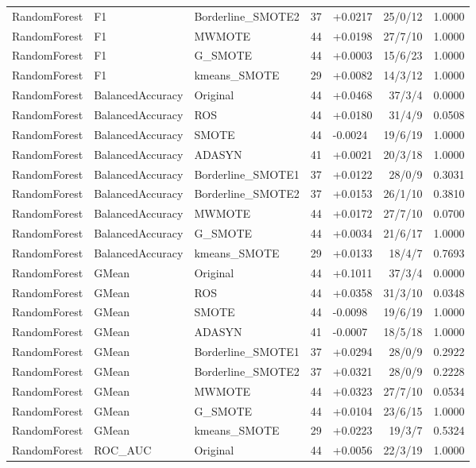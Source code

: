 \documentclass[10pt,a4paper]{article}
\begin{document}
\begin{longtable}{lllllrr}
RandomForest & F1 & Borderline\_SMOTE2 & 37 & +0.0217 & 25/0/12 & 1.0000 \\
RandomForest & F1 & MWMOTE & 44 & +0.0198 & 27/7/10 & 1.0000 \\
RandomForest & F1 & G\_SMOTE & 44 & +0.0003 & 15/6/23 & 1.0000 \\
RandomForest & F1 & kmeans\_SMOTE & 29 & +0.0082 & 14/3/12 & 1.0000 \\
RandomForest & BalancedAccuracy & Original & 44 & +0.0468 & 37/3/4 & 0.0000 \\
RandomForest & BalancedAccuracy & ROS & 44 & +0.0180 & 31/4/9 & 0.0508 \\
RandomForest & BalancedAccuracy & SMOTE & 44 & -0.0024 & 19/6/19 & 1.0000 \\
RandomForest & BalancedAccuracy & ADASYN & 41 & +0.0021 & 20/3/18 & 1.0000 \\
RandomForest & BalancedAccuracy & Borderline\_SMOTE1 & 37 & +0.0122 & 28/0/9 & 0.3031 \\
RandomForest & BalancedAccuracy & Borderline\_SMOTE2 & 37 & +0.0153 & 26/1/10 & 0.3810 \\
RandomForest & BalancedAccuracy & MWMOTE & 44 & +0.0172 & 27/7/10 & 0.0700 \\
RandomForest & BalancedAccuracy & G\_SMOTE & 44 & +0.0034 & 21/6/17 & 1.0000 \\
RandomForest & BalancedAccuracy & kmeans\_SMOTE & 29 & +0.0133 & 18/4/7 & 0.7693 \\
RandomForest & GMean & Original & 44 & +0.1011 & 37/3/4 & 0.0000 \\
RandomForest & GMean & ROS & 44 & +0.0358 & 31/3/10 & 0.0348 \\
RandomForest & GMean & SMOTE & 44 & -0.0098 & 19/6/19 & 1.0000 \\
RandomForest & GMean & ADASYN & 41 & -0.0007 & 18/5/18 & 1.0000 \\
RandomForest & GMean & Borderline\_SMOTE1 & 37 & +0.0294 & 28/0/9 & 0.2922 \\
RandomForest & GMean & Borderline\_SMOTE2 & 37 & +0.0321 & 28/0/9 & 0.2228 \\
RandomForest & GMean & MWMOTE & 44 & +0.0323 & 27/7/10 & 0.0534 \\
RandomForest & GMean & G\_SMOTE & 44 & +0.0104 & 23/6/15 & 1.0000 \\
RandomForest & GMean & kmeans\_SMOTE & 29 & +0.0223 & 19/3/7 & 0.5324 \\
RandomForest & ROC\_AUC & Original & 44 & +0.0056 & 22/3/19 & 1.0000 \\

\end{longtable}
\end{document}
